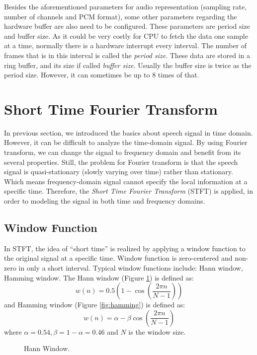 \documentclass[11pt,a4paper]{report}
\begin{document}
Besides the aforementioned parameters for audio representation (sampling rate, number of channels and PCM format), some other parameters regarding the hardware buffer are also need to be configured. These parameters are period size and buffer size. As it could be very costly for CPU to fetch the data one sample at a time, normally there is a hardware interrupt every interval. The number of frames that is in this interval is called the \textit{period size}. These data are stored in a ring buffer, and its size if called \textit{buffer size}. Usually the buffer size is twice as the period size. However, it can sometimes be up to 8 times of that.

\section{Short Time Fourier Transform}
In previous section, we introduced the basics about speech signal in time domain. However, it can be difficult to analyze the time-domain signal. By using Fourier transform, we can change the signal to frequency domain and benefit from its several properties. Still, the problem for Fourier transform is that the speech signal is quasi-stationary (slowly varying over time) rather than stationary. Which means frequency-domain signal cannot specify the local information at a specific time. Therefore, the \textit{Short Time Fourier Transform} (STFT) is applied, in order to modeling the signal in both time and frequency domains.

\subsection{Window Function}
In STFT, the idea of ``short time'' is realized by applying a window function to the original signal at a specific time. Window function is zero-centered and non-zero in only a short interval. Typical window functions include: Hann window, Hamming window\cite{heinzel_spectrum_2002}. The Hann window (Figure \ref{fig:hann}) is defined as:
\[ w(n) = 0.5 (1 - \cos(\frac{2\pi n}{N-1})) \]
and Hamming window (Figure \ref{fig:hamming}) is defined as:
\[ w(n) = \alpha - \beta \cos(\frac{2\pi n}{N-1}) \]
where $\alpha = 0.54, \beta = 1 - \alpha = 0.46$ and $N$ is the window size.

\begin{figure}[htbp]
  \centering
  
  \caption[Hann Window]{Hann Window.}
  \label{fig:hann}
\end{figure}
\end{document}
